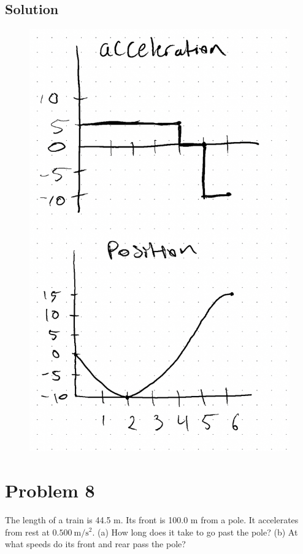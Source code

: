 \documentclass{article}
\begin{document}
\pagebreak
\subsection*{Solution}
\begin{figure}[!ht]
    \centering
    \includegraphics[scale=0.25]{solution-7.png}
\end{figure}


\section*{Problem 8}
The length of a train is 44.5 m. Its front is 100.0 m from a pole. It accelerates from rest at $0.500\ \unit{\meter\per\second^2}$. (a) How long does it take to go past the pole? (b) At what speeds do its front and rear pass the pole?
\end{document}
